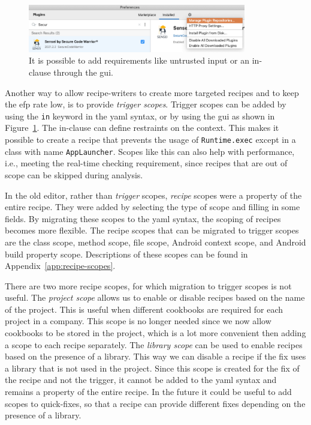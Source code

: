 \begin{figure}[t]
  \centering
  \includegraphics[width=0.85\textwidth,page=9]{04-tools/figures/figures2.pdf}
  \caption[\Gls{gui} to add the requirement of untrusted input.]{It is possible to add requirements like untrusted input or an in-clause through the \gls{gui}.}
  \label{fig:recipegui}
\end{figure}

Another way to allow recipe-writers to create more targeted recipes and to keep the \gls{efp} rate low, is to provide \emph{trigger scopes}.
Trigger scopes can be added by using the \texttt{in} keyword in the \gls{yaml} syntax, or by using the \gls{gui} as shown in Figure~\ref{fig:recipegui}.
The in-clause can define restraints on the context.
This makes it possible to create a recipe that prevents the usage of \texttt{Runtime.exec} except in a class with name \texttt{AppLauncher}.
Scopes like this can also help with performance, i.e., meeting the real-time checking requirement, since recipes that are out of scope can be skipped during analysis.

In the old editor, rather than \emph{trigger} scopes, \emph{recipe} scopes were a property of the entire recipe.
They were added by selecting the type of scope and filling in some fields.
By migrating these scopes to the \gls{yaml} syntax, the scoping of recipes becomes more flexible.
The recipe scopes that can be migrated to trigger scopes are the class scope, method scope, file scope, Android context scope, and Android build property scope.
Descriptions of these scopes can be found in Appendix~\ref{app:recipe-scopes}.

There are two more recipe scopes, for which migration to trigger scopes is not useful.
The \emph{project scope} allows us to enable or disable recipes based on the name of the project.
This is useful when different cookbooks are required for each project in a company.
This scope is no longer needed since we now allow cookbooks to be stored in the project, which is a lot more convenient then adding a scope to each recipe separately.
The \emph{library scope} can be used to enable recipes based on the presence of a library.
This way we can disable a recipe if the fix uses a library that is not used in the project.
Since this scope is created for the fix of the recipe and not the trigger, it cannot be added to the \gls{yaml} syntax and remains a property of the entire recipe.
In the future it could be useful to add scopes to quick-fixes, so that a recipe can provide different fixes depending on the presence of a library.

